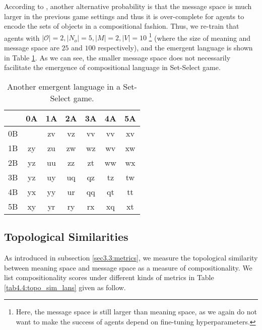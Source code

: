 According to \cite{kottur2017natural}, another alternative probability is that the message space is much larger in the previous game settings and thus it is over-complete for agents to encode the sets of objects in a compositional fashion. Thus, we re-train that agents with $|\mathcal{O}|=2, |N_o|=5, |M|=2, |V|=10$ \footnote{Here, the message space is still larger than meaning space, as we again do not want to make the success of agents depend on fine-tuning hyperparameters.} (where the size of meaning and message space are $25$ and $100$ respectively), and the emergent language is shown in Table \ref{tab4.4:emregent_language_referential2}. As we can see, the smaller message space does not necessarily facilitate the emergence of compositional language in Set-Select game.

\begin{table}[!h]
    \centering
    \begin{tabular}{|c|c|c|c|c|c|c|}
        \hline
           & 0A & 1A & 2A & 3A & 4A & 5A \\ \hline
        0B &    & zv & vz & vv & vv & xv \\ \hline
        1B & zy & zu & zw & wz & wv & xw \\ \hline
        2B & yz & uu & zz & zt & ww & wx \\ \hline
        3B & yz & uy & uq & qz & tz & tw \\ \hline
        4B & yx & yy & ur & qq & qt & tt \\ \hline
        5B & xy & yr & ry & rx & xq & xt \\ \hline
        \end{tabular}
    \caption{Another emergent language in a Set-Select game.}
    \label{tab4.4:emregent_language_referential2}
\end{table}

\subsection{Topological Similarities}
\label{ssec4.2.2:topo_sim}

As introduced in subsection \ref{sec3.3:metrics}, we measure the topological similarity between meaning space and message space as a measure of compositionality. We list compositionality scores under different kinds of metrics in Table \ref{tab4.4:topo_sim_lans} given as follow.

